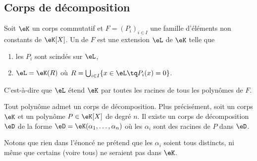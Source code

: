 
\subsection{Corps de décomposition}

\begin{definition}      \label{DEFooEKGZooSkvbum}
    Soit \( \eK\) un corps commutatif et \( F=(P_i)_{i\in I}\) une famille d'éléments non constants de \( \eK[X]\). Un  de \( F\) est une extension \( \eL\) de \( \eK\) telle que
    \begin{enumerate}
        \item
            les \( P_i\) sont scindés sur \( \eL\),
        \item
            \( \eL=\eK(R)\) où \( R=\bigcup_{i\in I}\{ x\in\eL\tq P_i(x)=0 \}\).
    \end{enumerate}
    C'est-à-dire que \( \eL\) étend \( \eK\) par toutes les racines de tous les polynômes de \( F\).
\end{definition}

\begin{proposition}      \label{PROPooDPOYooFHcqkU}
    Tout polynôme admet un corps de décomposition. Plus précisément, soit un corps \( \eK\) et un polynôme \( P\in \eK[X]\) de degré \( n\). Il existe un corps de décomposition \( \eD\) de la forme \( \eD=\eK(\alpha_1,\ldots,\alpha_n)\) où les \( \alpha_i\) sont des racines de \( P\) dans \( \eD\).
\end{proposition}

Notons que rien dans l'énoncé ne prétend que les \( \alpha_i\) soient tous distincts, ni même que certains (voire tous) ne seraient pas dans \( \eK\).

